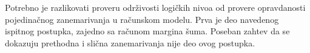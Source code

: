 Potrebno je razlikovati proveru održivosti logičkih nivoa od provere opravdanosti pojedinačnog zanemarivanja u računskom modelu. Prva je deo navedenog ispitnog postupka, zajedno sa računom margina šuma. Poseban zahtev da se dokazuju prethodna i slična zanemarivanja nije deo ovog postupka.
